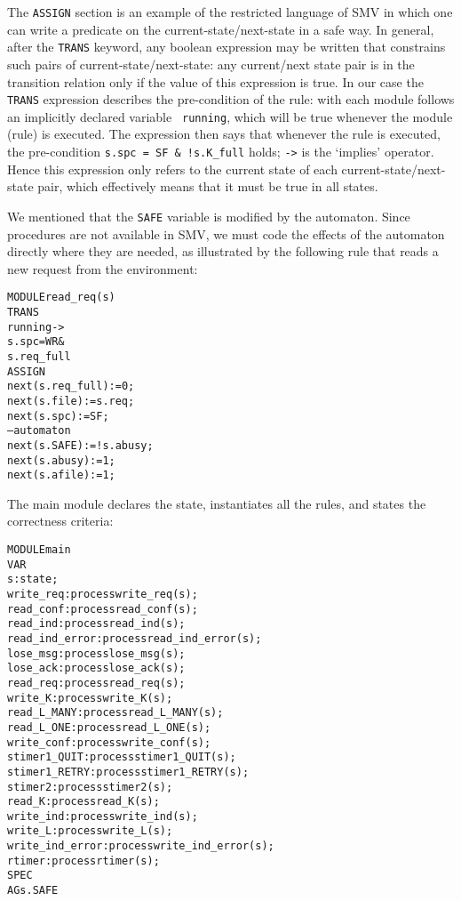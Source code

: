 The {\tt ASSIGN} section  is an example of  the restricted language of
SMV in which one can write a predicate on the current-state/next-state
in a safe way. In general, after the {\tt  TRANS} keyword, any boolean
expression    may   be  written    that   constrains   such  pairs  of
current-state/next-state:  any  current/next   state pair   is in  the
transition relation only if the value of  this expression is true.  In
our case the {\tt TRANS} expression describes the pre-condition of the
rule: with each module follows  an  implicitly declared variable  {\tt
running},  which will be true whenever  the module (rule) is executed.
The  expression then  says  that whenever  the  rule is executed,  the
pre-condition {\tt s.spc  = SF \& !s.K\_full} holds;  {\tt ->} is  the
`implies'  operator.  Hence  this   expression only  refers to   the
current state of each current-state/next-state pair, which effectively
means that it must be true in all states.

We   mentioned that  the   {\tt  SAFE}  variable  is  modified  by the
automaton.  Since procedures are not  available in  SMV, we must  code
the  effects  of the  automaton directly   where they  are  needed, as
illustrated by  the following rule that  reads a  new request from the
environment:

\begin{alltt}
  MODULE read_req(s) 
  TRANS 
    running -> 
    s.spc = WR & 
    s.req_full
  ASSIGN
    next(s.req_full) := 0;
    next(s.file) := s.req;
    next(s.spc) := SF;
    -- automaton
    next(s.SAFE) := !s.abusy;
    next(s.abusy) := 1;
    next(s.afile) := 1;
\end{alltt}

The main module declares the state, instantiates all the rules,
and states the correctness criteria:

\begin{alltt}
  MODULE main
  VAR
    s   : state; 
    write_req       : process write_req(s);
    read_conf       : process read_conf(s);
    read_ind        : process read_ind(s);
    read_ind_error  : process read_ind_error(s);
    lose_msg        : process lose_msg(s);
    lose_ack        : process lose_ack(s);
    read_req        : process read_req(s);
    write_K         : process write_K(s);
    read_L_MANY     : process read_L_MANY(s);
    read_L_ONE      : process read_L_ONE(s);
    write_conf      : process write_conf(s);
    stimer1_QUIT    : process stimer1_QUIT(s);
    stimer1_RETRY   : process stimer1_RETRY(s);
    stimer2         : process stimer2(s);
    read_K          : process read_K(s);
    write_ind       : process write_ind(s);
    write_L         : process write_L(s);
    write_ind_error : process write_ind_error(s);
    rtimer          : process rtimer(s);
  SPEC
    AG s.SAFE
\end{alltt}  

